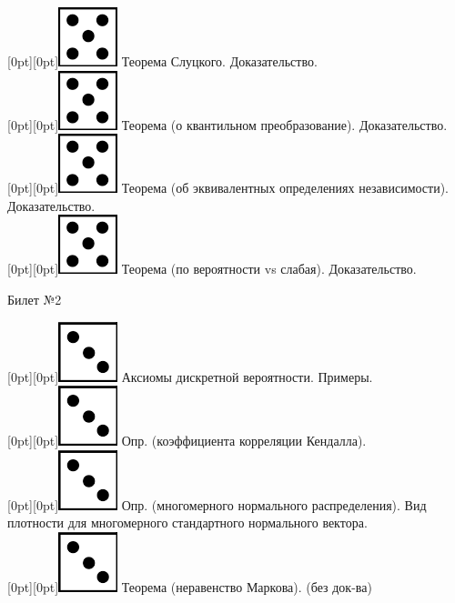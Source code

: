 \documentclass[10pt]{article}
\begin{document}
\raisebox{-1pt}[0pt][0pt]{\includegraphics[width=0.02\linewidth]{5.png}} Теорема Слуцкого. Доказательство. \\

\raisebox{-1pt}[0pt][0pt]{\includegraphics[width=0.02\linewidth]{5.png}}  Теорема (о квантильном преобразование). Доказательство. \\

\raisebox{-1pt}[0pt][0pt]{\includegraphics[width=0.02\linewidth]{5.png}} Теорема (об эквивалентных определениях независимости). Доказательство. \\

\raisebox{-1pt}[0pt][0pt]{\includegraphics[width=0.02\linewidth]{5.png}} Теорема (по вероятности vs слабая). Доказательство. \\  

\begin{center} {\Large Билет №2} \end{center} 

\raisebox{-1pt}[0pt][0pt]{\includegraphics[width=0.02\linewidth]{3.png}} Аксиомы дискретной вероятности. Примеры. \\

\raisebox{-1pt}[0pt][0pt]{\includegraphics[width=0.02\linewidth]{3.png}} Опр. (коэффициента корреляции Кендалла). \\

\raisebox{-1pt}[0pt][0pt]{\includegraphics[width=0.02\linewidth]{3.png}} Опр. (многомерного нормального распределения). Вид плотности для многомерного стандартного нормального вектора. \\ 

\raisebox{-1pt}[0pt][0pt]{\includegraphics[width=0.02\linewidth]{3.png}} Теорема (неравенство Маркова). (без док-ва) \\
\end{document}
